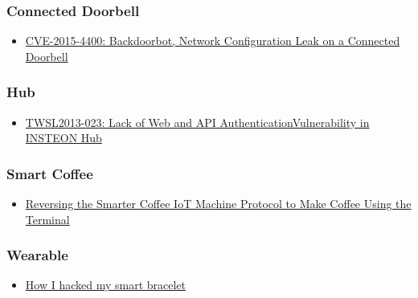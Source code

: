 \hypertarget{connected-doorbell}{%
\subsubsection{Connected Doorbell}\label{connected-doorbell}}

\begin{itemize}
\tightlist
\item
  \href{https://blog.fortinet.com/2016/01/22/cve-2015-4400-backdoorbot-network-configuration-leak-on-a-connected-doorbell}{CVE-2015-4400:
  Backdoorbot, Network Configuration Leak on a Connected Doorbell}
\end{itemize}

\hypertarget{hub}{%
\subsubsection{Hub}\label{hub}}

\begin{itemize}
\tightlist
\item
  \href{https://www.trustwave.com/Resources/Security-Advisories/Advisories/TWSL2013-023/?fid=3869}{TWSL2013-023:
  Lack of Web and API AuthenticationVulnerability in INSTEON Hub}
\end{itemize}

\hypertarget{smart-coffee}{%
\subsubsection{Smart Coffee}\label{smart-coffee}}

\begin{itemize}
\tightlist
\item
  \href{https://www.evilsocket.net/2016/10/09/IoCOFFEE-Reversing-the-Smarter-Coffee-IoT-machine-protocol-to-make-coffee-using-terminal/}{Reversing
  the Smarter Coffee IoT Machine Protocol to Make Coffee Using the
  Terminal}
\end{itemize}

\hypertarget{wearable}{%
\subsubsection{Wearable}\label{wearable}}

\begin{itemize}
\tightlist
\item
  \href{https://securelist.com/blog/research/69369/how-i-hacked-my-smart-bracelet/}{How
  I hacked my smart bracelet}
\end{itemize}

